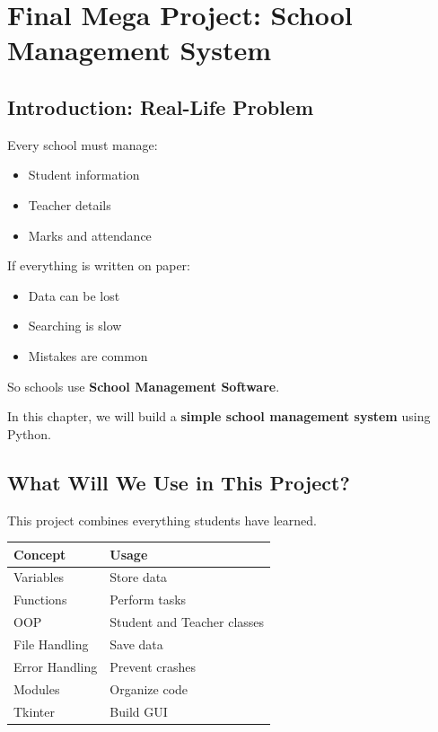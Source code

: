 \chapter{Final Mega Project: School Management System}

\section{Introduction: Real-Life Problem}

Every school must manage:
\begin{itemize}
    \item Student information
    \item Teacher details
    \item Marks and attendance
\end{itemize}

If everything is written on paper:
\begin{itemize}
    \item Data can be lost
    \item Searching is slow
    \item Mistakes are common
\end{itemize}

So schools use \textbf{School Management Software}.

In this chapter, we will build a \textbf{simple school management system} using Python.

\section{What Will We Use in This Project?}

This project combines everything students have learned.

\begin{center}
\begin{tabular}{|l|l|}
\hline
\textbf{Concept} & \textbf{Usage} \\
\hline
Variables & Store data \\
Functions & Perform tasks \\
OOP & Student and Teacher classes \\
File Handling & Save data \\
Error Handling & Prevent crashes \\
Modules & Organize code \\
Tkinter & Build GUI \\
\hline
\end{tabular}
\end{center}

